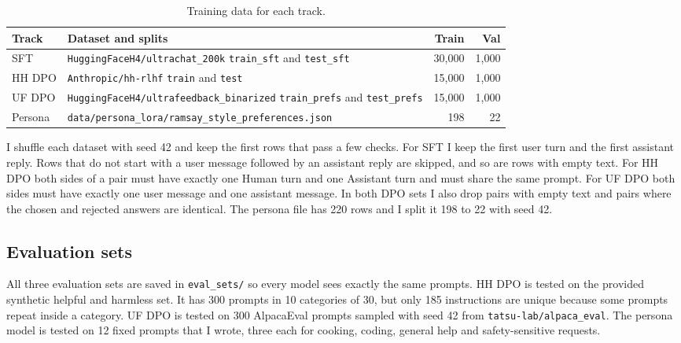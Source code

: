 \documentclass[11pt]{article}
\newcommand{\brk}{\allowbreak}
\begin{document}
\begin{table}[htbp]
\centering\small
\begin{tabularx}{\textwidth}{l Y r r}
\toprule
Track & Dataset and splits & Train & Val \\
\midrule
SFT & \texttt{HuggingFaceH4/\brk ultrachat\_200k} \newline \texttt{train\_sft} and \texttt{test\_sft} & 30,000 & 1,000 \\
HH DPO & \texttt{Anthropic/\brk hh-rlhf} \newline \texttt{train} and \texttt{test} & 15,000 & 1,000 \\
UF DPO & \texttt{HuggingFaceH4/\brk ultrafeedback\_\brk binarized} \newline \texttt{train\_prefs} and \texttt{test\_prefs} & 15,000 & 1,000 \\
Persona & \texttt{data/\brk persona\_lora/\brk ramsay\_style\_\brk preferences.json} & 198 & 22 \\
\bottomrule
\end{tabularx}
\caption{Training data for each track.}
\label{tab:data}
\end{table}

I shuffle each dataset with seed 42 and keep the first rows that pass a few checks.
For SFT I keep the first user turn and the first assistant reply.
Rows that do not start with a user message followed by an assistant reply are skipped, and so are rows with empty text.
For HH DPO both sides of a pair must have exactly one Human turn and one Assistant turn and must share the same prompt.
For UF DPO both sides must have exactly one user message and one assistant message.
In both DPO sets I also drop pairs with empty text and pairs where the chosen and rejected answers are identical.
The persona file has 220 rows and I split it 198 to 22 with seed 42.

\subsection{Evaluation sets}

All three evaluation sets are saved in \texttt{eval\_sets/} so every model sees exactly the same prompts.
HH DPO is tested on the provided synthetic helpful and harmless set.
It has 300 prompts in 10 categories of 30, but only 185 instructions are unique because some prompts repeat inside a category.
UF DPO is tested on 300 AlpacaEval prompts sampled with seed 42 from \texttt{tatsu-lab/\brk alpaca\_eval}.
The persona model is tested on 12 fixed prompts that I wrote, three each for cooking, coding, general help and safety-sensitive requests.
\end{document}
